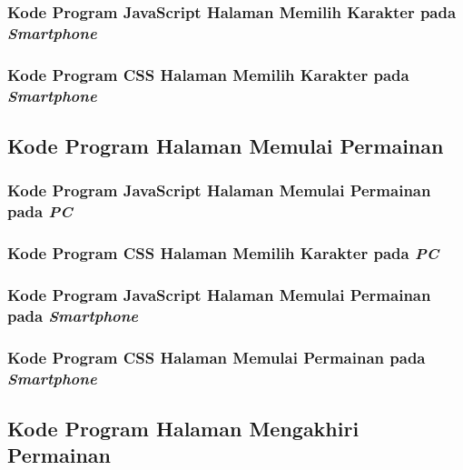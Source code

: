 \subsubsection{Kode Program JavaScript Halaman Memilih Karakter pada \textit{Smartphone}}


\subsubsection{Kode Program CSS Halaman Memilih Karakter pada \textit{Smartphone}}


\subsection{Kode Program Halaman Memulai Permainan}
\subsubsection{Kode Program JavaScript Halaman Memulai Permainan pada \textit{PC}}


\subsubsection{Kode Program CSS Halaman Memilih Karakter pada \textit{PC}}


\subsubsection{Kode Program JavaScript Halaman Memulai Permainan pada \textit{Smartphone}}


\subsubsection{Kode Program CSS Halaman Memulai Permainan pada \textit{Smartphone}}


\subsection{Kode Program Halaman Mengakhiri Permainan}
